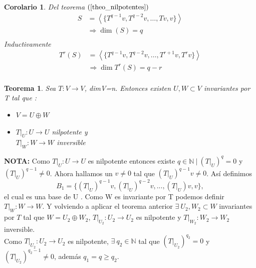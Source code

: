 \documentclass[12pt,a4paper]{article}
\newtheorem{mytheo}{Teorema}[section]
\newtheorem{mycorol}{Corolario}[section]
\begin{document}
\begin{multicols}{2}
\begin{mycorol}
	Del teorema $(\ref{theo_nilpotentes})$
	\begin{align*}
		S &= \left<\{T^{q-1}v, T^{q-2}v,\ldots,Tv, v\}\right>\\
		&\Rightarrow\dim (S) = q\\			
	\end{align*}
    Inductivamente 
	\begin{align*}
		T^{r}(S) &= \left<\{T^{q-1}v, T^{q-2}v,\ldots,T^{r+1}v, T^{r}v\}\right>\\
		&\Rightarrow\dim T^{r}(S) = q-r\\			
	\end{align*}
\end{mycorol}
\begin{mytheo}
\noindent Sea $T:V\rightarrow V$, dimV=n. Entonces existen $U, W \subset V$ invariantes por T tal que :
\begin{itemize}
    \item $V=U\oplus W$ 
    \item $T|_{U}:U\rightarrow U$ nilpotente  y\\ $T|_{W}:W\rightarrow W$ inversible
\end{itemize}
\end{mytheo}
\noindent\textbf{NOTA:}
\noindent Como $T|_{U}:U\rightarrow U$ es nilpotente entonces existe $q\in\mathbb{N} \ | \  \left(T|_{U}\right)^{q}=0 $ y $(T|_{U})^{q-1}\neq 0$. Ahora hallamos un $v\neq0$ tal que $(T|_{U})^{q-1}v\neq 0$. Así definimos 
$$B_{1}=\{(T|_{U})^{q-1}v, (T|_{U})^{q-2}v, ..., (T|_{U})v,v \},$$ el cual es una base de U . Como W es invariante por T podemos definir $T|_{W}:W\rightarrow W$. Y volviendo a aplicar el teorema anterior $\exists \ U_{2}, W_{2} \subset W$ invariantes por $T$ tal que  $W=U_{2}\oplus W_{2}$,
$T|_{U_{2}}: U_{2}\rightarrow U_{2}$ es nilpotente y $T|_{W_{2}}:W_{2}\rightarrow W_{2}$ inversible.\\
Como $T|_{U_{2}}:U_{2}\rightarrow U_{2}$ es nilpotente, $\exists \ q_{2} \in \mathbb{N}$ tal que $ (T|_{U_{2}})^{q_{2}}=0$ y $(T|_{U_{2}})^{q_{2}-1}\neq 0$, además  $q_{1}=q\geq q_{2}.$

\end{multicols}
\end{document}
